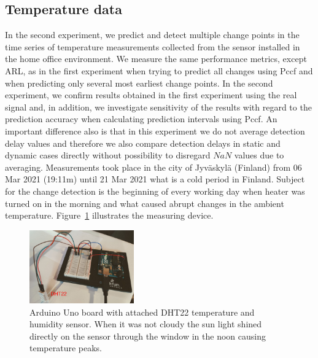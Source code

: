 \subsection{Temperature data}
In the second experiment, we predict and detect multiple change points in the time series of temperature measurements collected from the sensor installed in the home office environment.
We measure the same performance metrics, except ARL, as in the first experiment when trying to predict all changes using Pccf and when predicting only several most earliest change points.
In the second experiment, we confirm results obtained in the first experiment using the real signal and, in addition, we investigate sensitivity of the results with regard to the prediction accuracy when calculating prediction intervals using Pccf.
An important difference also is that in this experiment we do not average detection delay values and therefore we also compare detection delays in static and dynamic cases directly without possibility to disregard $NaN$ values due to averaging.
Measurements took place in the city of Jyv\"{a}skyl\"{a} (Finland) from 06 Mar 2021 (19:11m) until 21 Mar 2021 what is a cold period in Finland.
Subject for the change detection is the beginning of every working day when heater was turned on in the morning and what caused abrupt changes in the ambient temperature.
Figure~\ref{fig:dht22} illustrates the measuring device.
\begin{figure}[htb!]
	\centering
	\includegraphics[width=0.4\textwidth]{articles/pics/journal_paper/DHT22.png}
	\caption{
		Arduino Uno board with attached DHT22 temperature and humidity sensor.
		When it was not cloudy the sun light shined directly on the sensor through the window in the noon causing temperature peaks.
	}
	\label{fig:dht22}
\end{figure}
